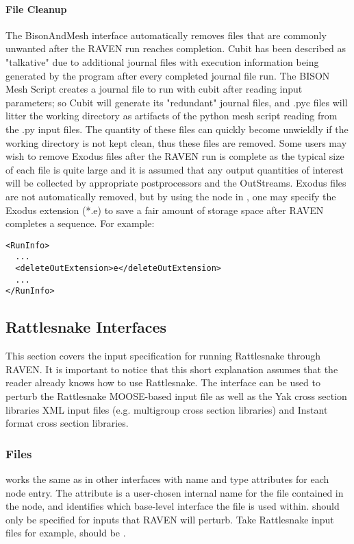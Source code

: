 \paragraph{File Cleanup}
The BisonAndMesh interface automatically removes files that are commonly
unwanted after the RAVEN run reaches completion. Cubit has been described as
"talkative" due to additional journal files with execution information
being generated by the program after every completed journal file run.
The BISON Mesh Script creates a journal file to run with cubit after reading input parameters;
so Cubit will generate its "redundant" journal files, and .pyc files will
litter the working directory as artifacts of the python mesh script
reading from the .py input files.  The quantity of these files can quickly
become unwieldly if the working directory is not kept clean, thus these
files are removed.  Some users
may wish to remove Exodus files after the RAVEN run is complete as
the typical size of each file is quite large and it is assumed that any
output quantities of interest will be collected by appropriate postprocessors
and the OutStreams.  Exodus files are not automatically removed,
but by using the  node in , one
may specify the Exodus extension (*.e) to save a fair amount of storage space
after RAVEN completes a sequence. For example:

\begin{lstlisting}[style=XML]
<RunInfo>
  ...
  <deleteOutExtension>e</deleteOutExtension>
  ...
</RunInfo>
\end{lstlisting}

\subsection{Rattlesnake Interfaces} \label{RattlesnakeInterfaces}
%
This section covers the input specification for running Rattlesnake through RAVEN. It is important
to notice that this short explanation assumes that the reader already knows how to use Rattlesnake.
The interface can be used to perturb the Rattlesnake MOOSE-based input file as well as the Yak
cross section libraries XML input files (e.g. multigroup cross section libraries) and Instant format
cross section libraries.
%
\subsubsection{Files}
 works the same as in other interfaces with name and type
attributes for each node entry.  The  attribute is a user-chosen internal
name for the file contained in the node, and  identifies which base-level
interface the file is used within.   should only be specified for inputs
that RAVEN will perturb. Take Rattlesnake input files for example,  should
be .

